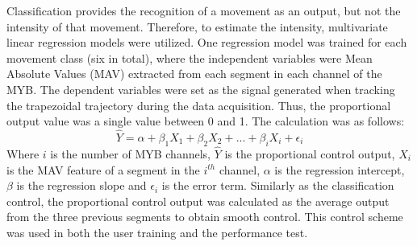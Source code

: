 Classification provides the recognition of a movement as an output, but not the intensity of that movement. Therefore, to estimate the intensity, multivariate linear regression models were utilized. One regression model was trained for each movement class (six in total), where the independent variables were Mean Absolute Values (MAV) extracted from each segment in each channel of the MYB. The dependent variables were set as the signal generated when tracking the trapezoidal trajectory during the data acquisition. Thus, the proportional output value was a single value between 0 and 1. The calculation was as follows: 
\vspace{-0.2cm}
\begin{equation} \label{eq:P:multiLinearRegression}
\hat{Y} = \alpha + \beta_1 X_{1} + \beta_2 X_{2} + ... + \beta_i X_{i} + \epsilon_i
\end{equation} 
\vspace{-0.05cm}
Where $i$ is the number of MYB channels, $\hat{Y}$ is the proportional control output, $X_{i}$ is the MAV feature of a segment in the $i^{th}$ channel, $\alpha$ is the regression intercept, $\beta$ is the regression slope and $\epsilon_{i}$ is the error term. Similarly as the classification control, the proportional control output was calculated as the average output from the three previous segments to obtain smooth control. This control scheme was used in both the user training and the performance test.